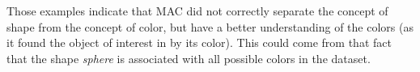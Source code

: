 Those examples indicate that MAC did not correctly separate the concept of shape from the concept of color, but have a better understanding of the colors (as it found the object of interest in  by its color). This could come from that fact that the shape \textit{sphere} is associated with all possible colors in the dataset. 
